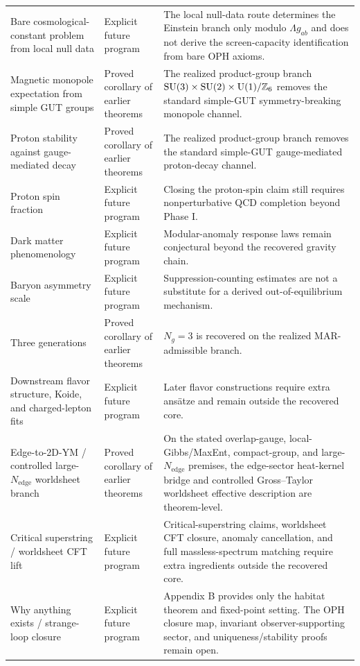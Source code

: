 \begin{center}
\begin{tabular}{@{}>{\raggedright\arraybackslash}p{}>{\raggedright\arraybackslash}p{}>{\raggedright\arraybackslash}p{}@{}}
Bare cosmological-constant problem from local null data & Explicit future program & The local null-data route determines the Einstein branch only modulo \(\Lambda g_{ab}\) and does not derive the screen-capacity identification from bare OPH axioms. \\
Magnetic monopole expectation from simple GUT groups & Proved corollary of earlier theorems & The realized product-group branch \(\mathrm{SU}(3)\times\mathrm{SU}(2)\times\mathrm{U}(1)/\mathbb Z_6\) removes the standard simple-GUT symmetry-breaking monopole channel. \\
Proton stability against gauge-mediated decay & Proved corollary of earlier theorems & The realized product-group branch removes the standard simple-GUT gauge-mediated proton-decay channel. \\
Proton spin fraction & Explicit future program & Closing the proton-spin claim still requires nonperturbative QCD completion beyond Phase I. \\
Dark matter phenomenology & Explicit future program & Modular-anomaly response laws remain conjectural beyond the recovered gravity chain. \\
Baryon asymmetry scale & Explicit future program & Suppression-counting estimates are not a substitute for a derived out-of-equilibrium mechanism. \\
Three generations & Proved corollary of earlier theorems & \(N_g=3\) is recovered on the realized MAR-admissible branch. \\
Downstream flavor structure, Koide, and charged-lepton fits & Explicit future program & Later flavor constructions require extra ans\"atze and remain outside the recovered core. \\
Edge-to-2D-YM / controlled large-\(N_{\mathrm{edge}}\) worldsheet branch & Proved corollary of earlier theorems & On the stated overlap-gauge, local-Gibbs/MaxEnt, compact-group, and large-\(N_{\mathrm{edge}}\) premises, the edge-sector heat-kernel bridge and controlled Gross--Taylor worldsheet effective description are theorem-level. \\
Critical superstring / worldsheet CFT lift & Explicit future program & Critical-superstring claims, worldsheet CFT closure, anomaly cancellation, and full massless-spectrum matching require extra ingredients outside the recovered core. \\
Why anything exists / strange-loop closure & Explicit future program & Appendix B provides only the habitat theorem and fixed-point setting. The OPH closure map, invariant observer-supporting sector, and uniqueness/stability proofs remain open. \\

\end{tabular}
\end{center}

